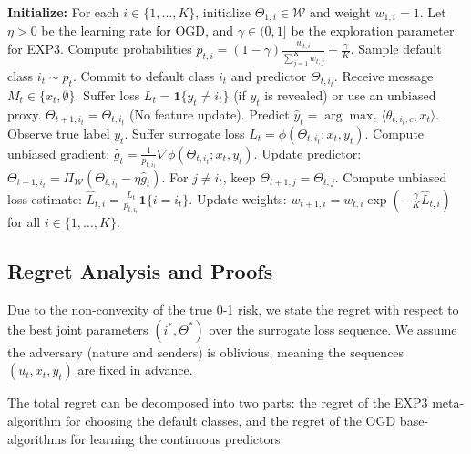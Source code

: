 \documentclass[11pt]{article}
\begin{document}
\begin{algorithm}[H]
\caption{Online Multiclass Classification with Strategic Withholding}
\label{alg:online_classification}
\begin{algorithmic}[1]
\STATE \textbf{Initialize:} For each $i \in \{1, \dots, K\}$, initialize $\Theta_{1,i} \in \mathcal{W}$ and weight $w_{1,i} = 1$. Let $\eta > 0$ be the learning rate for OGD, and $\gamma \in (0, 1]$ be the exploration parameter for EXP3.
    \STATE Compute probabilities $p_{t,i} = (1-\gamma) \frac{w_{t,i}}{\sum_{j=1}^K w_{t,j}} + \frac{\gamma}{K}$.
    \STATE Sample default class $i_t \sim p_{t}$.
    \STATE Commit to default class $i_t$ and predictor $\Theta_{t, i_t}$.
    \STATE Receive message $M_t \in \{x_t, \emptyset\}$.
        \STATE Suffer loss $L_t = \mathbf{1}\{y_t \neq i_t\}$ (if $y_t$ is revealed) or use an unbiased proxy.
        \STATE $\Theta_{t+1, i_t} = \Theta_{t, i_t}$ (No feature update).
    \ELSE
        \STATE Predict $\hat{y}_t = \arg\max_c \langle \theta_{t,i_t, c}, x_t \rangle$.
        \STATE Observe true label $y_t$.
        \STATE Suffer surrogate loss $L_t = \phi(\Theta_{t, i_t}; x_t, y_t)$.
        \STATE Compute unbiased gradient: $\hat{g}_t = \frac{1}{p_{t, i_t}} \nabla \phi(\Theta_{t, i_t}; x_t, y_t)$.
        \STATE Update predictor: $\Theta_{t+1, i_t} = \Pi_{\mathcal{W}}\left( \Theta_{t, i_t} - \eta \hat{g}_t \right)$.
    \ENDIF
    \STATE For $j \neq i_t$, keep $\Theta_{t+1, j} = \Theta_{t, j}$.
    \STATE Compute unbiased loss estimate: $\hat{L}_{t, i} = \frac{L_t}{p_{t, i_t}} \mathbf{1}\{i = i_t\}$.
    \STATE Update weights: $w_{t+1, i} = w_{t, i} \exp\left(-\frac{\gamma}{K} \hat{L}_{t, i}\right)$ for all $i \in \{1, \dots, K\}$.
\ENDFOR
\end{algorithmic}
\end{algorithm}

\subsection{Regret Analysis and Proofs}

Due to the non-convexity of the true 0-1 risk, we state the regret with respect to the best joint parameters $(i^*, \Theta^*)$ over the surrogate loss sequence. We assume the adversary (nature and senders) is oblivious, meaning the sequences $(u_t, x_t, y_t)$ are fixed in advance.

The total regret can be decomposed into two parts: the regret of the EXP3 meta-algorithm for choosing the default classes, and the regret of the OGD base-algorithms for learning the continuous predictors.
\end{document}
